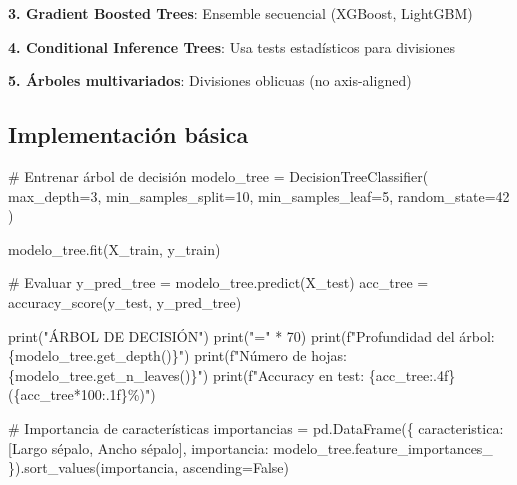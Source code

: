 \documentclass[
  doc,
  floatsintext,
  longtable,
  a4paper,
  nolmodern,
  notxfonts,
  notimes,
  12pt,
  colorlinks=true,linkcolor=blue,citecolor=blue,urlcolor=blue]{apa7}
\newenvironment{Shaded}{\begin{snugshade}}{\end{snugshade}}
\newcommand{\BuiltInTok}[1]{\textcolor[rgb]{0.00,0.23,0.31}{#1}}
\newcommand{\CommentTok}[1]{\textcolor[rgb]{0.37,0.37,0.37}{#1}}
\newcommand{\DecValTok}[1]{\textcolor[rgb]{0.68,0.00,0.00}{#1}}
\newcommand{\NormalTok}[1]{\textcolor[rgb]{0.00,0.23,0.31}{#1}}
\newcommand{\OperatorTok}[1]{\textcolor[rgb]{0.37,0.37,0.37}{#1}}
\newcommand{\SpecialCharTok}[1]{\textcolor[rgb]{0.37,0.37,0.37}{#1}}
\newcommand{\SpecialStringTok}[1]{\textcolor[rgb]{0.13,0.47,0.30}{#1}}
\newcommand{\StringTok}[1]{\textcolor[rgb]{0.13,0.47,0.30}{#1}}
\newcommand{\VariableTok}[1]{\textcolor[rgb]{0.07,0.07,0.07}{#1}}
\begin{document}
\textbf{3. Gradient Boosted Trees}: Ensemble secuencial (XGBoost,
LightGBM)

\textbf{4. Conditional Inference Trees}: Usa tests estadísticos para
divisiones

\textbf{5. Árboles multivariados}: Divisiones oblicuas (no axis-aligned)

\subsection{Implementación básica}\label{implementaciuxf3n-buxe1sica}

\begin{Shaded}
\begin{Highlighting}[]
\CommentTok{\# Entrenar árbol de decisión}
\NormalTok{modelo\_tree }\OperatorTok{=}\NormalTok{ DecisionTreeClassifier(}
\NormalTok{    max\_depth}\OperatorTok{=}\DecValTok{3}\NormalTok{,}
\NormalTok{    min\_samples\_split}\OperatorTok{=}\DecValTok{10}\NormalTok{,}
\NormalTok{    min\_samples\_leaf}\OperatorTok{=}\DecValTok{5}\NormalTok{,}
\NormalTok{    random\_state}\OperatorTok{=}\DecValTok{42}
\NormalTok{)}

\NormalTok{modelo\_tree.fit(X\_train, y\_train)}

\CommentTok{\# Evaluar}
\NormalTok{y\_pred\_tree }\OperatorTok{=}\NormalTok{ modelo\_tree.predict(X\_test)}
\NormalTok{acc\_tree }\OperatorTok{=}\NormalTok{ accuracy\_score(y\_test, y\_pred\_tree)}

\BuiltInTok{print}\NormalTok{(}\StringTok{"ÁRBOL DE DECISIÓN"}\NormalTok{)}
\BuiltInTok{print}\NormalTok{(}\StringTok{"="} \OperatorTok{*} \DecValTok{70}\NormalTok{)}
\BuiltInTok{print}\NormalTok{(}\SpecialStringTok{f"Profundidad del árbol: }\SpecialCharTok{\{}\NormalTok{modelo\_tree}\SpecialCharTok{.}\NormalTok{get\_depth()}\SpecialCharTok{\}}\SpecialStringTok{"}\NormalTok{)}
\BuiltInTok{print}\NormalTok{(}\SpecialStringTok{f"Número de hojas: }\SpecialCharTok{\{}\NormalTok{modelo\_tree}\SpecialCharTok{.}\NormalTok{get\_n\_leaves()}\SpecialCharTok{\}}\SpecialStringTok{"}\NormalTok{)}
\BuiltInTok{print}\NormalTok{(}\SpecialStringTok{f"Accuracy en test: }\SpecialCharTok{\{}\NormalTok{acc\_tree}\SpecialCharTok{:.4f\}}\SpecialStringTok{ (}\SpecialCharTok{\{}\NormalTok{acc\_tree}\OperatorTok{*}\DecValTok{100}\SpecialCharTok{:.1f\}}\SpecialStringTok{\%)"}\NormalTok{)}

\CommentTok{\# Importancia de características}
\NormalTok{importancias }\OperatorTok{=}\NormalTok{ pd.DataFrame(\{}
    \StringTok{\textquotesingle{}caracteristica\textquotesingle{}}\NormalTok{: [}\StringTok{\textquotesingle{}Largo sépalo\textquotesingle{}}\NormalTok{, }\StringTok{\textquotesingle{}Ancho sépalo\textquotesingle{}}\NormalTok{],}
    \StringTok{\textquotesingle{}importancia\textquotesingle{}}\NormalTok{: modelo\_tree.feature\_importances\_}
\NormalTok{\}).sort\_values(}\StringTok{\textquotesingle{}importancia\textquotesingle{}}\NormalTok{, ascending}\OperatorTok{=}\VariableTok{False}\NormalTok{)}


\end{Highlighting}
\end{Shaded}
\end{document}
